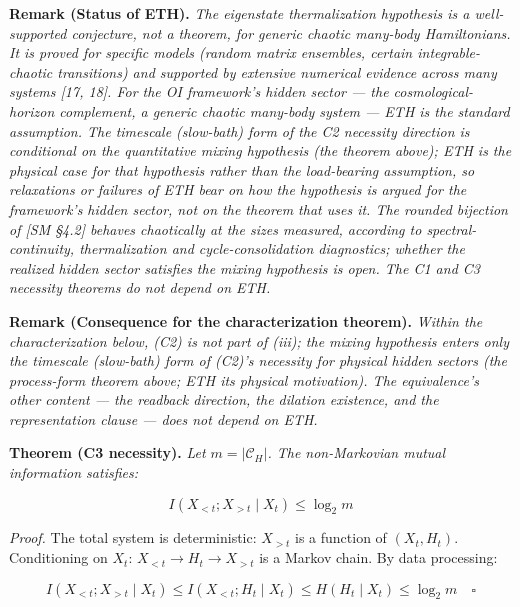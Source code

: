 \documentclass[
]{article}
\begin{document}
\textbf{Remark (Status of ETH).} \emph{The eigenstate thermalization
hypothesis is a well-supported conjecture, not a theorem, for generic
chaotic many-body Hamiltonians. It is proved for specific models (random
matrix ensembles, certain integrable-chaotic transitions) and supported
by extensive numerical evidence across many systems {[}17, 18{]}. For
the OI framework's hidden sector --- the cosmological-horizon
complement, a generic chaotic many-body system --- ETH is the standard
assumption. The timescale (slow-bath) form of the C2 necessity direction
is conditional on the quantitative mixing hypothesis (the theorem
above); ETH is the physical case for that hypothesis rather than the
load-bearing assumption, so relaxations or failures of ETH bear on how
the hypothesis is argued for the framework's hidden sector, not on the
theorem that uses it. The rounded bijection of {[}SM §4.2{]} behaves
chaotically at the sizes measured, according to spectral-continuity,
thermalization and cycle-consolidation diagnostics; whether the realized
hidden sector satisfies the mixing hypothesis is open. The C1 and C3
necessity theorems do not depend on ETH.}

\textbf{Remark (Consequence for the characterization theorem).}
\emph{Within the characterization below, (C2) is not part of (iii); the
mixing hypothesis enters only the timescale (slow-bath) form of (C2)'s
necessity for physical hidden sectors (the process-form theorem above;
ETH its physical motivation). The equivalence's other content --- the
readback direction, the dilation existence, and the representation
clause --- does not depend on ETH.}

\textbf{Theorem (C3 necessity).} \emph{Let \(m = |\mathcal{C}_H|\). The
non-Markovian mutual information satisfies:}

\[I(X_{<t} ; X_{>t} \mid X_t) \leq \log_2 m\]

\emph{Proof.} The total system is deterministic: \(X_{>t}\) is a
function of \((X_t, H_t)\). Conditioning on \(X_t\):
\(X_{<t} \to H_t \to X_{>t}\) is a Markov chain. By data processing:

\[I(X_{<t} ; X_{>t} \mid X_t) \leq I(X_{<t} ; H_t \mid X_t) \leq H(H_t \mid X_t) \leq \log_2 m \quad \square\]
\end{document}
